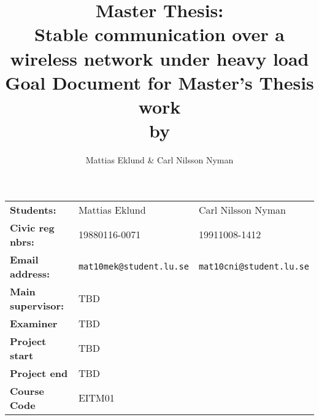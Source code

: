 \documentclass[a4paper]{article}
\title{Master Thesis:\\\Large{Stable communication over a wireless network under
	heavy load}
\\\large{Goal Document for Master's Thesis work\\by}}
\author{Mattias Eklund \& Carl Nilsson Nyman}
\date{}
\begin{document}
\maketitle
\thispagestyle{empty}

\pagebreak
\setcounter{page}{1}

\begin{tabular}{lll}
	\textbf{Students:} & Mattias Eklund & Carl Nilsson Nyman \\
	\textbf{Civic reg nbrs:} & 19880116-0071& 19911008-1412\\
	\textbf{Email address:} & \texttt{mat10mek@student.lu.se}
	& \texttt{mat10cni@student.lu.se} \\
	\textbf{Main supervisor:} & TBD & \\
	\textbf{Examiner} & TBD & \\
	\textbf{Project start} & TBD & \\
	\textbf{Project end} & TBD & \\
	\textbf{Course Code} & EITM01 & 
\end{tabular}

%
%
%
%
\end{document}
